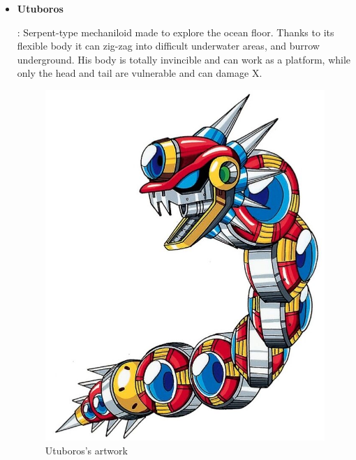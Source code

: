 \begin{itemize}
		\item \hypertarget{miniboss:Utuboros}{\textbf{Utuboros}}: Serpent-type mechaniloid made to explore the ocean floor. Thanks to its flexible body it can zig-zag into difficult underwater areas, and burrow underground. His body is totally invincible and can work as a platform, while only the head and tail are vulnerable and can damage X.
		\begin{figure}[htp]
			\centering
			\includegraphics[width=0.4\linewidth]{figures/X1/Enemies/Utuboros.jpg}
			\caption{Utuboros's artwork}
		\end{figure}
	\end{itemize}


